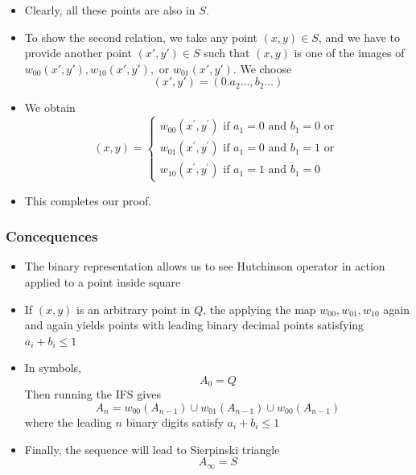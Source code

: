 \documentclass{beamer}
\begin{document}
\begin{frame}
    \begin{itemize}
        \item Clearly, all these points are also in $S$.
        \item To show the second relation, we take any point $(x,y) \in S$, and we have to provide another point $(x',y') \in S$ such that $(x,y)$ is one of the images of $w_{00}(x',y'),w_{10}(x',y'),$ or $w_{01}(x',y')$. We choose 
        \begin{equation*}
            (x',y') = (0.a_2\dots,b_2\dots)
        \end{equation*}
        \item We obtain 
        \begin{equation*}
            (x, y)=\left\{\begin{array}{l}{w_{00}\left(x^{\prime}, y^{\prime}\right) \text { if } a_{1}=0 \text { and } b_{1}=0 \text { or }} \\ {w_{01}\left(x^{\prime}, y^{\prime}\right) \text { if } a_{1}=0 \text { and } b_{1}=1 \text { or }} \\ {w_{10}\left(x^{\prime}, y^{\prime}\right) \text { if } a_{1}=1 \text { and } b_{1}=0}\end{array}\right.
        \end{equation*}
        \item This completes our proof.
    \end{itemize}
\end{frame}

\begin{frame}
    \frametitle{Concequences}
    \begin{itemize}
        \item The binary representation allows us to see Hutchinson operator in action applied to a point inside square
        \item If $(x,y)$ is an arbitrary point in $Q$, the applying the map $w_{00},w_{01},w_{10}$ again and again yields points with leading binary decimal points satisfying $a_i + b_i \leq 1$
        \item In symbols,
        \begin{equation*}
            A_0 = Q
        \end{equation*} 
        Then running the IFS gives 
        \begin{equation*}
            A_n = w_{00}(A_{n-1}) \cup w_{01}(A_{n-1}) \cup w_{00}(A_{n-1})
        \end{equation*}
        where the leading $n$ binary digits satisfy $a_i + b_i \leq 1$
        \item Finally, the sequence will lead to Sierpinski triangle
        \begin{equation*}
            A_\infty = S
        \end{equation*}
    \end{itemize}
\end{frame}
\end{document}
